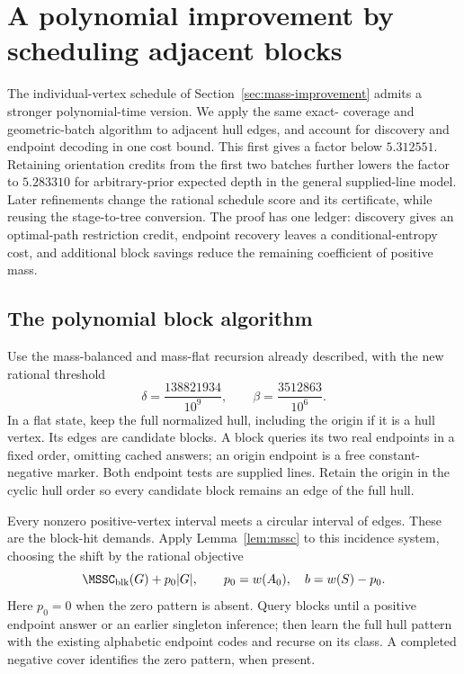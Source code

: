 \section{A polynomial improvement by scheduling adjacent blocks}
\label{sec:polynomial-blocks}

The individual-vertex schedule of Section~\ref{sec:mass-improvement}
admits a stronger polynomial-time version. We apply the same exact-
coverage and geometric-batch algorithm to adjacent hull edges, and
account for discovery and endpoint decoding in one cost bound.
This first gives a factor below $5.312551$. Retaining orientation
credits from the first two batches further lowers the factor to
$5.283310$ for arbitrary-prior expected depth in the general
supplied-line model. Later refinements change the rational schedule
score and its certificate, while reusing the stage-to-tree conversion.
The proof has one ledger: discovery gives an optimal-path restriction
credit, endpoint recovery leaves a conditional-entropy cost, and
additional block savings reduce the remaining coefficient of positive
mass.

\subsection{The polynomial block algorithm}

Use the mass-balanced and mass-flat recursion already described, with
the new rational threshold
\[
 \delta=\frac{138821934}{10^9},\qquad
 \beta=\frac{3512863}{10^6}.
\]
In a flat state, keep the full normalized hull, including the origin
if it is a hull vertex. Its edges are candidate blocks. A block queries
its two real endpoints in a fixed order, omitting cached answers; an
origin endpoint is a free constant-negative marker. Both endpoint tests
are supplied lines. Retain the origin in the cyclic hull order so every
candidate block remains an edge of the full hull.

Every nonzero positive-vertex interval meets a circular interval of
edges. These are the block-hit demands. Apply
Lemma~\ref{lem:mssc} to this incidence system, choosing the shift by
the rational objective
\[
 \MSSC_{\mathrm{blk}}(G)+p_0|G|,
 \qquad p_0=w(A_0),\quad b=w(S)-p_0.
\]
Here $p_0=0$ when the zero pattern is absent. Query blocks until a
positive endpoint answer or an earlier singleton inference; then learn
the full hull pattern with the existing alphabetic endpoint codes and
recurse on its class. A completed negative cover identifies the zero
pattern, when present.

